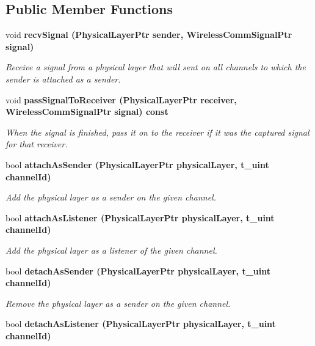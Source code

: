 \subsection*{Public Member Functions}
\begin{CompactItemize}
\item 
void \bf{recv\-Signal} (Physical\-Layer\-Ptr sender, Wireless\-Comm\-Signal\-Ptr signal)
\begin{CompactList}\small\item\em Receive a signal from a physical layer that will sent on all channels to which the sender is attached as a sender. \item\end{CompactList}\item 
void \bf{pass\-Signal\-To\-Receiver} (Physical\-Layer\-Ptr receiver, Wireless\-Comm\-Signal\-Ptr signal) const 
\begin{CompactList}\small\item\em When the signal is finished, pass it on to the receiver if it was the captured signal for that receiver. \item\end{CompactList}\item 
bool \bf{attach\-As\-Sender} (Physical\-Layer\-Ptr physical\-Layer, \bf{t\_\-uint} channel\-Id)
\begin{CompactList}\small\item\em Add the physical layer as a sender on the given channel. \item\end{CompactList}\item 
bool \bf{attach\-As\-Listener} (Physical\-Layer\-Ptr physical\-Layer, \bf{t\_\-uint} channel\-Id)
\begin{CompactList}\small\item\em Add the physical layer as a listener of the given channel. \item\end{CompactList}\item 
bool \bf{detach\-As\-Sender} (Physical\-Layer\-Ptr physical\-Layer, \bf{t\_\-uint} channel\-Id)
\begin{CompactList}\small\item\em Remove the physical layer as a sender on the given channel. \item\end{CompactList}\item 
bool \bf{detach\-As\-Listener} (Physical\-Layer\-Ptr physical\-Layer, \bf{t\_\-uint} channel\-Id)

\end{CompactItemize}
